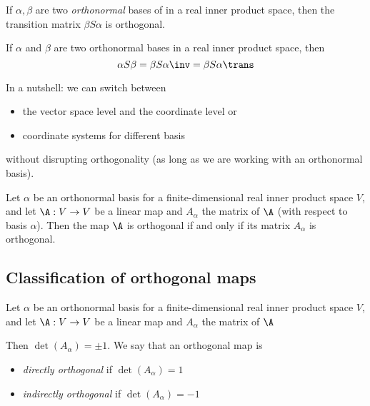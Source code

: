 \begin{theorem}
    If $\alpha, \beta$ are two \emph{orthonormal} bases of in a real inner product space, then the transition matrix $\beta S \alpha$ is orthogonal.
\end{theorem}

\begin{theorem}
    If $\alpha$ and $\beta$ are two orthonormal bases in a real inner product space, then
    $$\alpha S \beta = \beta S \alpha \inv = \beta S \alpha \trans$$
\end{theorem}

\begin{remark}
    In a nutshell: we can switch between 
    \begin{itemize}
        \item the vector space level and the coordinate level or 
        \item coordinate systems for different basis
    \end{itemize}
    without disrupting orthogonality (as long as we are working with an orthonormal basis).
\end{remark}

\begin{theorem}
    Let $\alpha$ be an orthonormal basis for a finite-dimensional real inner product space $V$, and 
    let $\A : V \to V$ be a linear map and $A_\alpha$ the matrix of $\A$ (with respect to basis $\alpha$).
    Then the map $\A$ is orthogonal if and only if its matrix $A_\alpha$ is orthogonal.
\end{theorem}

\subsection{Classification of orthogonal maps}
\begin{theorem}
    Let $\alpha$ be an orthonormal basis for a finite-dimensional real inner product space $V$, and let $\A: V \to V$ be
    a linear map and $A_\alpha$ the matrix of $\A$

    Then $\det(A_\alpha) = \pm 1$.
    We say that an orthogonal map is
    \begin{itemize}
        \item \emph{directly orthogonal} if $\det(A_\alpha) = 1$
        \item \emph{indirectly orthogonal} if $\det(A_\alpha) = -1$
    \end{itemize}
\end{theorem}

